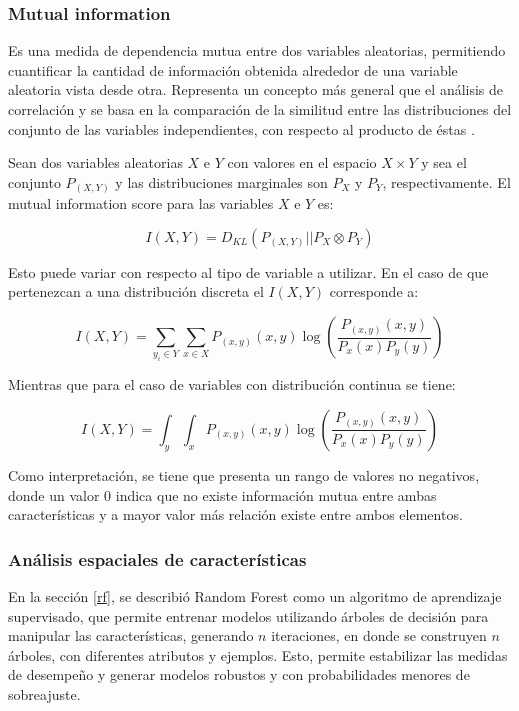\subsubsection{Mutual information}

Es una medida de dependencia mutua entre dos variables aleatorias, permitiendo cuantificar la cantidad de información obtenida alrededor de una variable aleatoria vista desde otra. Representa un concepto más general que el análisis de correlación y se basa en la comparación de la similitud entre las distribuciones del conjunto de las variables independientes, con respecto al producto de éstas \cite{peng2005feature}.

Sean dos variables aleatorias $X$ e $Y$ con valores en el espacio $X \times Y$ y sea el conjunto $P_{(X,Y)}$ y las distribuciones marginales son $P_X$ y $P_Y$, respectivamente. El mutual information score para las variables $X$ e $Y$ es:

\begin{equation}
	I(X,Y) = D_{KL}(P_{(X,Y)} || P_X \otimes P_Y)
\end{equation}

Esto puede variar con respecto al tipo de variable a utilizar. En el caso de que pertenezcan a una distribución discreta el $I(X,Y)$ corresponde a:

\begin{equation}
	I(X,Y) = \sum_{y_{i} \in Y} \sum_{x \in X} P_{(x,y)} (x,y) \log (\dfrac{P_{(x,y)}(x,y)}{P_{x}(x)P_{y}(y)})
\end{equation}

Mientras que para el caso de variables con distribución continua se tiene:

\begin{equation}
	I(X,Y) = \int_{y} \int_{x} P_{(x,y)} (x,y) \log (\dfrac{P_{(x,y)}(x,y)}{P_{x}(x)P_{y}(y)})
\end{equation}

Como interpretación, se tiene que presenta un rango de valores no negativos, donde un valor 0 indica que no existe información mutua entre ambas características y a mayor valor más relación existe entre ambos elementos.

\subsubsection{Análisis espaciales de características}

En la sección \ref{rf}, se describió Random Forest como un algoritmo de aprendizaje supervisado, que permite entrenar modelos utilizando árboles de decisión para manipular las características, generando $n$ iteraciones, en donde se construyen $n$ árboles, con diferentes atributos y ejemplos. Esto, permite estabilizar las medidas de desempeño y generar modelos robustos y con probabilidades menores de sobreajuste.

